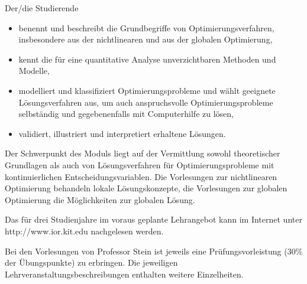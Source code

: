 \begin{module}
\begin{styleenv}
\begin{conditions}
 \end{conditions}


\end{styleenv}

\begin{learningoutcomes}
Der/die Studierende

 \begin{itemize}\item benennt und beschreibt die Grundbegriffe von Optimierungsverfahren, insbesondere aus der nichtlinearen und aus der globalen Optimierung,  \item kennt die für eine quantitative Analyse unverzichtbaren Methoden und Modelle,  \item modelliert und klassifiziert Optimierungsprobleme und wählt geeignete Lösungsverfahren aus, um auch anspruchsvolle Optimierungsprobleme selbständig und gegebenenfalls mit Computerhilfe zu lösen,  \item validiert, illustriert und interpretiert erhaltene Lösungen.  \end{itemize}
\end{learningoutcomes}

\begin{content}
Der Schwerpunkt des Moduls liegt auf der Vermittlung sowohl theoretischer Grundlagen als auch von Lösungsverfahren für Optimierungsprobleme mit kontinuierlichen Entscheidungsvariablen. Die Vorlesungen zur nichtlinearen Optimierung behandeln lokale Lösungskonzepte, die Vorlesungen zur globalen Optimierung die Möglichkeiten zur globalen Lösung.


\end{content}

\begin{remarks}Das für drei Studienjahre im voraus geplante Lehrangebot kann im Internet unter http://www.ior.kit.edu nachgelesen werden.

 

Bei den Vorlesungen von Professor Stein ist jeweils eine Prüfungsvorleistung (30\% der Übungspunkte) zu erbringen. Die jeweiligen Lehrveranstaltungsbeschreibungen enthalten \newline
weitere Einzelheiten.

\end{remarks}

\end{module}

